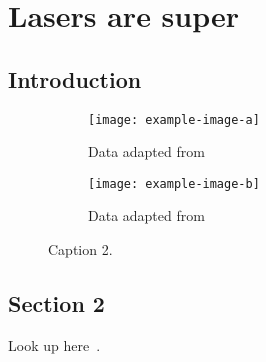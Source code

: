 \documentclass[../main.tex]{subfiles}
\begin{document}
\chapter{Lasers are super}
\label{ch:Chapter2} %

\section{Introduction}

\lipsum[2-4]

\begin{figure}[ht]
\centering
    \begin{subfigure}[t]{.59\columnwidth}
      \texttt{[image: example-image-a]}
      \caption{Data adapted from~\cite{Zorin:22} \label{fig:a}}
    \end{subfigure}
    \begin{subfigure}[t]{.39\columnwidth}
      \texttt{[image: example-image-b]}
      \caption{Data adapted from~\cite{Zorin:22}\label{fig:b}}
    \end{subfigure}
    \caption{Caption 2.}
    \label{fig:fig_2-1}
\end{figure}


\section{Section 2}

\lipsum[1-3]

Look up here~\cite{Zorin:22}.

\end{document}
